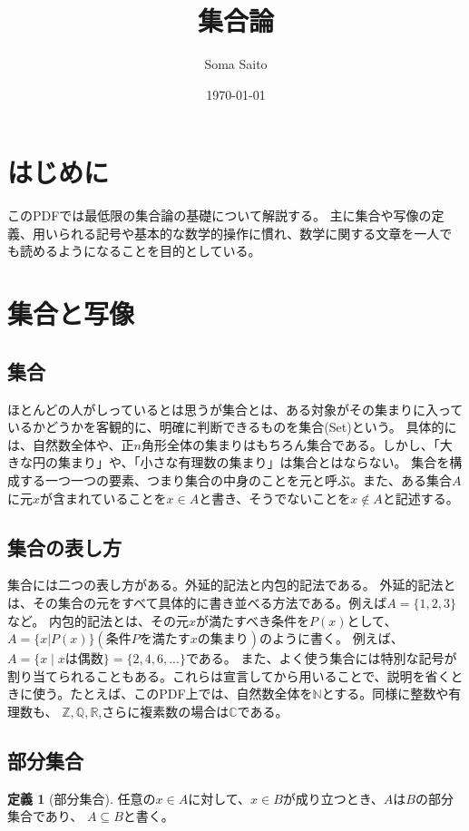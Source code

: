 \documentclass[unicode,12pt,report]{ltjsarticle}
\title{集合論}
\author{Soma Saito}
\date{\today}
\theoremstyle{definition}
\newtheorem{definition}{定義}[section]
\begin{document}
\maketitle
\tableofcontents
\clearpage

\section{はじめに}
このPDFでは最低限の集合論の基礎について解説する。
主に集合や写像の定義、用いられる記号や基本的な数学的操作に慣れ、数学に関する文章を一人でも読めるようになることを目的としている。

\section{集合と写像}
\subsection{集合}
ほとんどの人がしっているとは思うが集合とは、ある対象がその集まりに入っているかどうかを客観的に、明確に判断できるものを集合(Set)という。
具体的には、自然数全体や、正$n$角形全体の集まりはもちろん集合である。しかし、「大きな円の集まり」や、「小さな有理数の集まり」は集合とはならない。
集合を構成する一つ一つの要素、つまり集合の中身のことを元と呼ぶ。また、ある集合$A$に元$x$が含まれていることを$x \in A$と書き、そうでないことを$x \notin  A$と記述する。
\subsection{集合の表し方}
集合には二つの表し方がある。外延的記法と内包的記法である。
外延的記法とは、その集合の元をすべて具体的に書き並べる方法である。例えば$A = \{1, 2, 3\}$など。
内包的記法とは、その元$x$が満たすべき条件を$P(x)$として、$A = \{x | P(x)\} (条件Pを満たすxの集まり)$のように書く。
例えば、$A = \{x \mid xは偶数\} = \{2, 4, 6, ...\}$である。
また、よく使う集合には特別な記号が割り当てられることもある。これらは宣言してから用いることで、説明を省くときに使う。たとえば、このPDF上では、自然数全体を$\mathbb{N}$とする。同様に整数や有理数も、
$\mathbb{Z}, \mathbb{Q}, \mathbb{R}$,さらに複素数の場合は$\mathbb{C}$である。
\subsection{部分集合}
\begin{definition}[部分集合]
    任意の$x \in A$に対して、$x \in B$が成り立つとき、$A$は$B$の部分集合であり、
    $A\subseteq B$と書く。
\end{definition}
\end{document}
